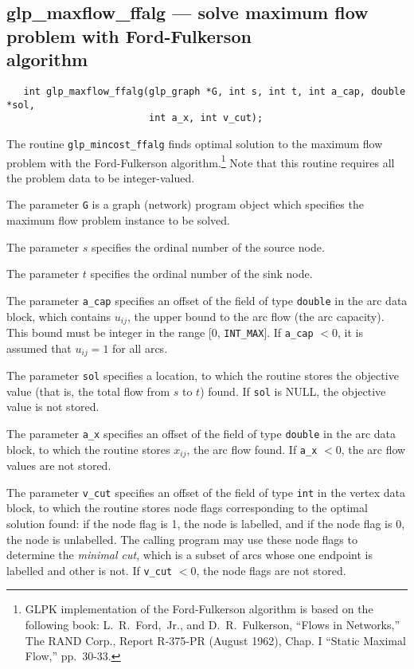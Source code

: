\documentclass[11pt]{report}
\def\para#1{\noindent{\bf#1}}
\def\synopsis{\para{Synopsis}}
\def\description{\para{Description}}
\begin{document}
\subsection{glp\_maxflow\_ffalg --- solve maximum flow problem with
Ford-Fulkerson\\algorithm}

\synopsis

\begin{verbatim}
   int glp_maxflow_ffalg(glp_graph *G, int s, int t, int a_cap, double *sol,
                         int a_x, int v_cut);
\end{verbatim}

\description

The routine \verb|glp_mincost_ffalg| finds optimal solution to the
maximum flow problem with the Ford-Fulkerson algorithm.\footnote{GLPK
implementation of the Ford-Fulkerson algorithm is based on the
following book: L.~R.~Ford,~Jr., and D.~R.~Fulkerson, ``Flows in
Networks,'' The RAND Corp., Report R-375-PR (August 1962), Chap. I
``Static Maximal Flow,'' pp.~30-33.} Note that this routine requires
all the problem data to be integer-valued.

The parameter \verb|G| is a graph (network) program object which
specifies the maximum flow problem instance to be solved.

The parameter $s$ specifies the ordinal number of the source node.

\newpage

The parameter $t$ specifies the ordinal number of the sink node.

The parameter \verb|a_cap| specifies an offset of the field of type
\verb|double| in the arc data block, which contains $u_{ij}$, the upper
bound to the arc flow (the arc capacity). This bound must be integer in
the range [0, \verb|INT_MAX|]. If \verb|a_cap| $<0$, it is assumed that
$u_{ij}=1$ for all arcs.

The parameter \verb|sol| specifies a location, to which the routine
stores the objective value (that is, the total flow from $s$ to $t$)
found. If \verb|sol| is NULL, the objective value is not stored.

The parameter \verb|a_x| specifies an offset of the field of type
\verb|double| in the arc data block, to which the routine stores
$x_{ij}$, the arc flow found. If \verb|a_x| $<0$, the arc flow values
are not stored.

The parameter \verb|v_cut| specifies an offset of the field of type
\verb|int| in the vertex data block, to which the routine stores node
flags corresponding to the optimal solution found: if the node flag is
1, the node is labelled, and if the node flag is 0, the node is
unlabelled. The calling program may use these node flags to determine
the {\it minimal cut}, which is a subset of arcs whose one endpoint is
labelled and other is not. If \verb|v_cut| $<0$, the node flags are not
stored.
\end{document}
